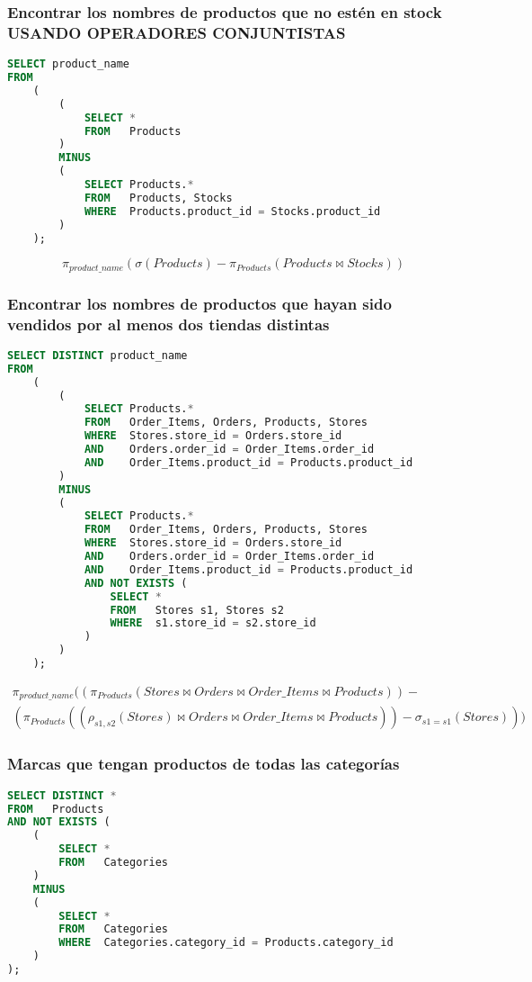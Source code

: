 \subsubsection{Encontrar los nombres de productos que no estén en stock USANDO OPERADORES CONJUNTISTAS}

\begin{lstlisting}[language=SQL]
SELECT product_name
FROM
	(
		(
			SELECT *
			FROM   Products
		)
		MINUS
		(
			SELECT Products.*
			FROM   Products, Stocks
			WHERE  Products.product_id = Stocks.product_id
		)
	);
\end{lstlisting}

\[\pi_{product\_name}(\sigma(Products)-\pi_{Products}(Products\bowtie Stocks))\]

\pagebreak

\subsubsection{Encontrar los nombres de productos que hayan sido vendidos por al menos dos tiendas distintas}

\begin{lstlisting}[language=SQL]
SELECT DISTINCT product_name
FROM
	(
		(
			SELECT Products.*
			FROM   Order_Items, Orders, Products, Stores
			WHERE  Stores.store_id = Orders.store_id
			AND    Orders.order_id = Order_Items.order_id
			AND    Order_Items.product_id = Products.product_id
		)
		MINUS
		(
			SELECT Products.*
			FROM   Order_Items, Orders, Products, Stores
			WHERE  Stores.store_id = Orders.store_id
			AND    Orders.order_id = Order_Items.order_id
			AND    Order_Items.product_id = Products.product_id
			AND NOT EXISTS (
				SELECT *
				FROM   Stores s1, Stores s2
				WHERE  s1.store_id = s2.store_id
			)
		)
	);
\end{lstlisting}

\[
\begin{split}
\pi_{product\_name}((\pi_{Products}(Stores\bowtie Orders\bowtie Order\_Items\bowtie Products))- \\
(\pi_{Products}((\rho_{s1,s2}(Stores)\bowtie Orders\bowtie Order\_Items\bowtie Products))-\sigma_{s1=s1}(Stores)))
\end{split}
\]

\subsubsection{Marcas que tengan productos de todas las categorías}

\begin{lstlisting}[language=SQL]
SELECT DISTINCT *
FROM   Products
AND NOT EXISTS (
	(
		SELECT *
		FROM   Categories
	)
	MINUS
	(
		SELECT *
		FROM   Categories
		WHERE  Categories.category_id = Products.category_id
	)
);
\end{lstlisting}

